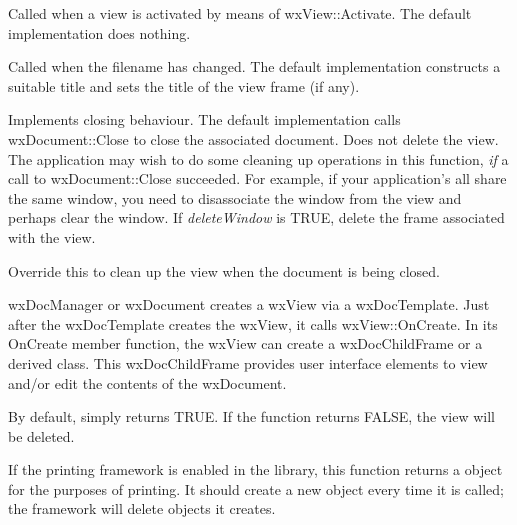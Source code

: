 
Called when a view is activated by means of wxView::Activate. The default implementation does
nothing.



Called when the filename has changed. The default implementation constructs a
suitable title and sets the title of the view frame (if any).



Implements closing behaviour. The default implementation calls wxDocument::Close
to close the associated document. Does not delete the view. The application
may wish to do some cleaning up operations in this function, {\it if} a
call to wxDocument::Close succeeded. For example, if your application's
all share the same window, you need to disassociate the window from the view
and perhaps clear the window. If {\it deleteWindow} is TRUE, delete the
frame associated with the view.

\label{wxviewonclosingdocument}


Override this to clean up the view when the document is being
closed.



wxDocManager or wxDocument creates a wxView via a wxDocTemplate.
Just after the wxDocTemplate creates the wxView, it calls
wxView::OnCreate. In its OnCreate member function, the wxView can create a wxDocChildFrame
or a derived class. This wxDocChildFrame provides user interface
elements to view and/or edit the contents of the wxDocument.

By default, simply returns TRUE. If the function returns FALSE, the
view will be deleted.



If the printing framework is enabled in the library, this function returns a
\rtfsp{} object for the purposes of printing. It should create a new object
every time it is called; the framework will delete objects it creates.

